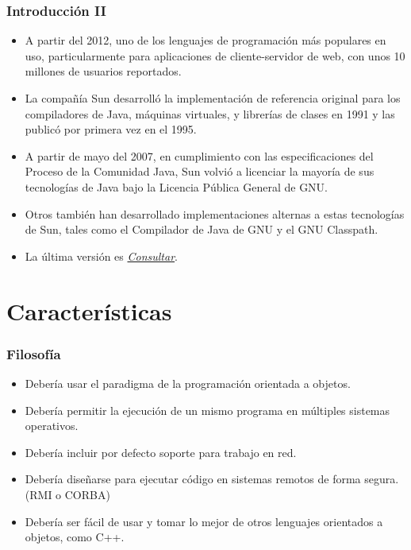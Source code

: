\documentclass{beamer}
\begin{document}
\begin{frame} 
\frametitle{Introducción II}
\begin{itemize}[<+->]
\item A partir del 2012, uno de los lenguajes de programación más populares en uso, particularmente para aplicaciones de cliente-servidor de web, con unos 10 millones de usuarios reportados.
\item La compañía Sun desarrolló la implementación de referencia original para los compiladores de Java, máquinas virtuales, y librerías de clases en 1991 y las publicó por primera vez en el 1995.
\item A partir de mayo del 2007, en cumplimiento con las especificaciones del Proceso de la Comunidad Java, Sun volvió a licenciar la mayoría de sus tecnologías de Java bajo la Licencia Pública General de GNU.
\item Otros también han desarrollado implementaciones alternas a estas tecnologías de Sun, tales como el Compilador de Java de GNU y el GNU Classpath.
\item La última versión es \href{https://en.wikipedia.org/wiki/Java_version_history}{\emph{Consultar}}. 
\end{itemize} 
\end{frame}


\section{Características} 

\begin{frame}
\frametitle{Filosofía}
\begin{itemize}[<+->]
\item Debería usar el paradigma de la programación orientada a objetos.
\item Debería permitir la ejecución de un mismo programa en múltiples sistemas operativos.
\item Debería incluir por defecto soporte para trabajo en red.
\item Debería diseñarse para ejecutar código en sistemas remotos de forma segura.(RMI o CORBA)
\item Debería ser fácil de usar y tomar lo mejor de otros lenguajes orientados a objetos, como C++.
\end{itemize} 
\end{frame}
\end{document}
